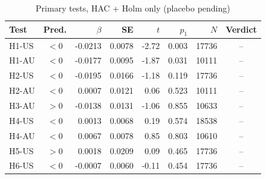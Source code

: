 \begin{table}[htbp]\centering\small
\caption{Primary tests, HAC + Holm only (placebo pending)}
\begin{tabular}{lcrrrrrc}\toprule
Test & Pred. & $\beta$ & SE & $t$ & $p_{1}$ & $N$ & Verdict \\ \midrule
H1-US & $<$0 & -0.0213 & 0.0078 & -2.72 & 0.003 & 17736 & -- \\
H1-AU & $<$0 & -0.0177 & 0.0095 & -1.87 & 0.031 & 10111 & -- \\
H2-US & $<$0 & -0.0195 & 0.0166 & -1.18 & 0.119 & 17736 & -- \\
H2-AU & $<$0 & 0.0007 & 0.0121 & 0.06 & 0.523 & 10111 & -- \\
H3-AU & $>$0 & -0.0138 & 0.0131 & -1.06 & 0.855 & 10633 & -- \\
H4-US & $<$0 & 0.0013 & 0.0068 & 0.19 & 0.574 & 18538 & -- \\
H4-AU & $<$0 & 0.0067 & 0.0078 & 0.85 & 0.803 & 10610 & -- \\
H5-US & $>$0 & 0.0018 & 0.0209 & 0.09 & 0.465 & 17736 & -- \\
H6-US & $<$0 & -0.0007 & 0.0060 & -0.11 & 0.454 & 17736 & -- \\
\bottomrule\end{tabular}\end{table}
